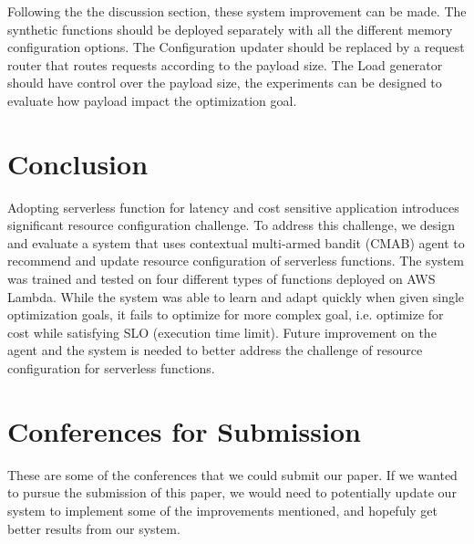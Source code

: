 \documentclass[conference]{IEEEtran}
\begin{document}
Following the the discussion section, these system improvement can be made. The synthetic functions should be deployed separately with all the different memory configuration options. The Configuration updater should be replaced by a request router that routes requests according to the payload size.  The Load generator should have control over the payload size, the experiments can be designed to evaluate how payload impact the optimization goal.

\section{Conclusion}

Adopting serverless function for latency and cost sensitive application introduces significant resource configuration challenge. To address this challenge, we design and evaluate a system that uses contextual multi-armed bandit (CMAB) agent to recommend and update resource configuration of serverless functions. The system was trained and tested on four different types of functions deployed on AWS Lambda. While the system was able to learn and adapt quickly when given single optimization goals, it fails to optimize for more complex goal, i.e. optimize for cost while satisfying SLO (execution time limit). Future improvement on the agent and the system is needed to better address the challenge of resource configuration for serverless functions.


\section{Conferences for Submission}

These are some of the conferences that we could submit our paper. If we wanted to pursue the submission of this paper, we would need to potentially update our system to implement some of the improvements mentioned, and hopefuly get better results from our system.
\end{document}

